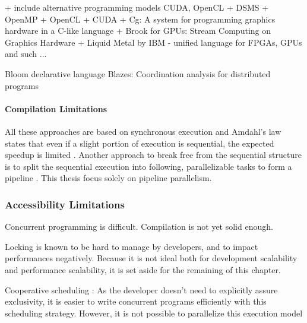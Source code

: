 + include alternative programming models CUDA, OpenCL + DSMS
  + OpenMP
  + OpenCL
  + CUDA
  + Cg: A system for programming graphics hardware in a C-like language
  + Brook for GPUs: Stream Computing on Graphics Hardware
  + Liquid Metal by IBM - unified language for FPGAs, GPUs and such ...


Bloom declarative language 
Blazes: Coordination analysis for distributed programs \cite{Alvaro2014}

\paragraph{Compilation Limitations}

All these approaches are based on synchronous execution and Amdahl's law states that even if a slight portion of execution is sequential, the expected speedup is limited \cite{Amdahl1967,Clements2013a}.
Another approach to break free from the sequential structure is to split the sequential execution into following, parallelizable tasks to form a pipeline \cite{Kamruzzaman2013,Fernandez2014a}.
This thesis focus solely on pipeline parallelism.





\subsubsection{Accessibility Limitations}

Concurrent programming is difficult.
Compilation is not yet solid enough.


Locking is known to be hard to manage by developers, and to impact performances negatively.
Because it is not ideal both for development scalability and performance scalability, it is set aside for the remaining of this chapter.

Cooperative scheduling :
As the developer doesn't need to explicitly assure exclusivity, it is easier to write concurrent programs efficiently with this scheduling strategy.
However, it is not possible to parallelize this execution model






